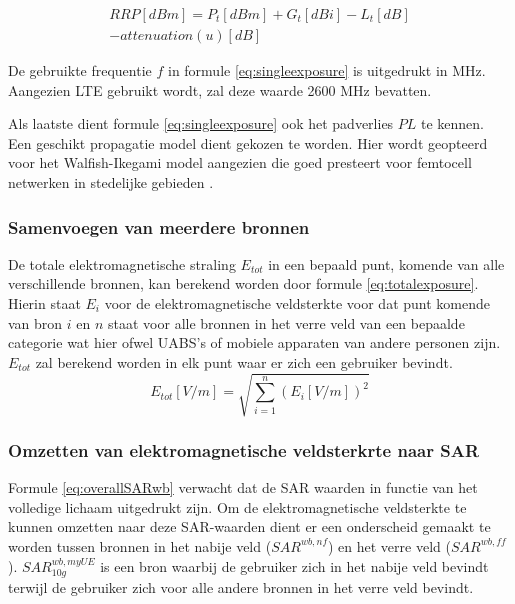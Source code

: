 \documentclass[twocolumn]{phdsymp_dutch}
\begin{document}
\begin{equation}
\begin{aligned}
RRP [dBm] = P_t [dBm] + G_t [dBi]- L_t [dB]\\
     - attenuation(u) [dB]
\end{aligned}
\label{eq:eirp}
\end{equation}

De gebruikte frequentie $f$ in formule \ref{eq:singleexposure} is uitgedrukt in MHz. Aangezien 
\gls{LTE} gebruikt wordt, zal deze waarde 2600 MHz bevatten.

Als laatste dient formule \ref{eq:singleexposure} ook het padverlies $PL$ te kennen.
Een geschikt propagatie model dient gekozen te worden. Hier wordt geopteerd voor het 
Walfish-Ikegami model aangezien die goed presteert voor femtocell netwerken in stedelijke gebieden \cite{J2}.

\subsubsection{Samenvoegen van meerdere bronnen}

De totale elektromagnetische straling $E_{tot}$ in een bepaald punt, komende van alle verschillende bronnen, kan berekend worden 
door formule \ref{eq:totalexposure}. Hierin staat $E_i$ voor de elektromagnetische veldsterkte voor dat punt komende van bron $i$
en $n$ staat voor alle bronnen in het verre veld van een bepaalde categorie wat hier ofwel \gls{UABS}'s of mobiele apparaten van andere personen zijn.
$E_{tot}$ zal berekend worden in elk punt waar er zich een gebruiker bevindt.
\begin{equation}
E_{tot} [V/m] = \sqrt{\sum_{i=1}^{n} (E_i [V/m]) ^2}
\label{eq:totalexposure}
\end{equation}

\subsubsection{Omzetten van elektromagnetische veldsterkrte naar \gls{SAR}}

Formule \ref{eq:overallSARwb}  verwacht dat de \gls{SAR} waarden in functie van het volledige lichaam uitgedrukt zijn.
Om de elektromagnetische veldsterkte te kunnen omzetten naar deze \gls{SAR}-waarden dient er een onderscheid gemaakt te worden 
tussen bronnen in het nabije veld ($SAR^{wb,nf}$) en het verre veld ($SAR^{wb,ff}$).
$SAR^{wb,myUE}_{10g}$ is een bron waarbij de gebruiker zich in het nabije veld bevindt terwijl 
de gebruiker zich voor alle andere bronnen in het verre veld bevindt.
\end{document}
